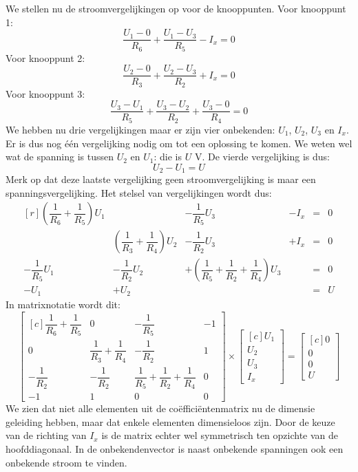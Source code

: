 We stellen nu de stroomvergelijkingen op voor de knooppunten. Voor knooppunt 1:
%
\begin{equation}
\dfrac{U_1-0}{R_6} + \dfrac{U_1-U_3}{R_5} - I_x = 0
\end{equation}
%
Voor knooppunt 2:
%
\begin{equation}
\dfrac{U_2-0}{R_3} + \dfrac{U_2-U_3}{R_2} + I_x = 0
\end{equation}
%
Voor knooppunt 3:
%
\begin{equation}
\dfrac{U_3-U_1}{R_5} + \dfrac{U_3-U_2}{R_2} + \dfrac{U_3-0}{R_4} = 0
\end{equation}
%
We hebben nu drie vergelijkingen maar er zijn vier onbekenden: $U_1$, $U_2$, $U_3$ en $I_x$. Er is dus nog één vergelijking nodig om tot een oplossing te komen. We weten wel wat de spanning is tussen $U_2$ en $U_1$: die is $U$ \si{\volt}. De vierde vergelijking is dus:
%
\begin{equation}
U_2-U_1 = U
\end{equation}
%
Merk op dat deze laatste vergelijking geen stroomvergelijking is maar een spanningsvergelijking. Het stelsel van vergelijkingen wordt dus:
%
\begin{equation}
\begin{matrix*}[r]
\left(\dfrac{1}{R_6}+\dfrac{1}{R_5}\right)U_1 & & -\dfrac{1}{R_5}U_3 & -I_x &=& 0 \\[1em]
 & \left(\dfrac{1}{R_3}+\dfrac{1}{R_4}\right)U_2 & -\dfrac{1}{R_2}U_3 & +I_x &=& 0 \\[1em]
-\dfrac{1}{R_5}U_1 & -\dfrac{1}{R_2}U_2 & +\left(\dfrac{1}{R_5}+\dfrac{1}{R_2}+\dfrac{1}{R_4}\right)U_3 & &=& 0 \\[1.5em]
-U_1 & +U_2 & & &= &U
\end{matrix*}
\end{equation}
%
In matrixnotatie wordt dit:
%
\begin{equation}
\begin{bmatrix*}[c]
\dfrac{1}{R_6}+\dfrac{1}{R_5} & 0 & -\dfrac{1}{R_5} & -1 \\[1em]
0 & \dfrac{1}{R_3}+\dfrac{1}{R_4} & -\dfrac{1}{R_2} & 1  \\[1em]
-\dfrac{1}{R_2} & -\dfrac{1}{R_2} & \dfrac{1}{R_5}+\dfrac{1}{R_2}+\dfrac{1}{R_4} & 0 \\[1.5em]
-1 & 1 & 0 & 0
\end{bmatrix*} \times
\begin{bmatrix*}[c]
U_1 \\[1em] U_2\\[1em] U_3\\[1em] I_x
\end{bmatrix*} = 
\begin{bmatrix*}[c]
0 \\[1em] 0 \\[1em] 0 \\[1em] U
\end{bmatrix*}
\end{equation}
%
We zien dat niet alle elementen uit de coëfficiëntenmatrix nu de dimensie geleiding hebben, maar dat enkele elementen dimensieloos zijn. Door de keuze van de richting van $I_x$ is de matrix echter wel symmetrisch ten opzichte van de hoofddiagonaal. In de onbekendenvector is naast onbekende spanningen ook een onbekende stroom te vinden.

